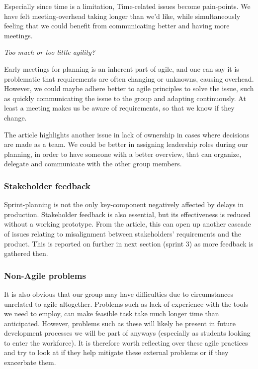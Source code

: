 Especially since time is a limitation, Time-related issues become pain-points. We have felt meeting-overhead taking longer than we'd like, while simultaneously feeling that we could benefit from communicating better and having more meetings.

\textit{Too much or too little agility?}

Early meetings for planning is an inherent part of agile, and one can say it is problematic that requirements are often changing or unknowns, causing overhead. However, we could maybe adhere better to agile principles to solve the issue, such as quickly communicating the issue to the group and adapting continuously. At least a meeting makes us be aware of requirements, so that we know if they change.

The article highlights another issue in lack of ownership in cases where decisions are made as a team. We could be better in assigning leadership roles during our planning, in order to have someone with a better overview, that can organize, delegate and communicate with the other group members.


\subsubsection{Stakeholder feedback}
Sprint-planning is not the only key-component negatively affected by delays in production. Stakeholder feedback is also essential, but its effectiveness is reduced without a working prototype. From the article\cite{DarkSide}, this can open up another cascade of issues relating to misalignment between stakeholders' requirements and the product.
This is reported on further in next section (sprint 3) as more feedback is gathered then.

\subsubsection{Non-Agile problems}
It is also obvious that our group may have difficulties due to circumstances unrelated to agile altogether. Problems such as lack of experience with the tools we need to employ, can make feasible task take much longer time than anticipated. However, problems such as these will likely be present in future development processes we will be part of anyways (especially as students looking to enter the workforce). It is therefore worth reflecting over these agile practices and try to look at if they help mitigate these external problems or if they exacerbate them.

